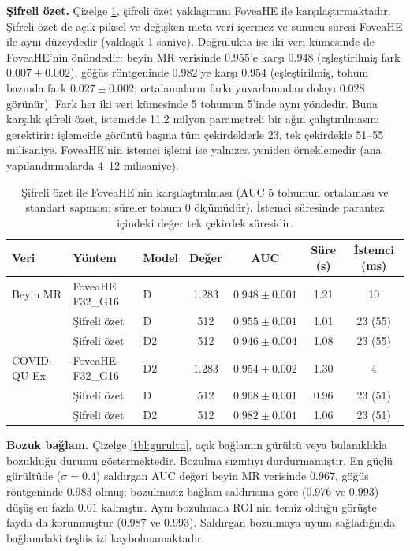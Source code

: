 \textbf{Şifreli özet.} Çizelge \ref{tbl:rakipler}, şifreli özet yaklaşımını FoveaHE ile karşılaştırmaktadır. Şifreli özet de açık piksel ve değişken meta veri içermez ve sunucu süresi FoveaHE ile aynı düzeydedir (yaklaşık 1 saniye). Doğrulukta ise iki veri kümesinde de FoveaHE'nin önündedir: beyin MR verisinde $0.955$'e karşı $0.948$ (eşleştirilmiş fark $0.007 \pm 0.002$), göğüs röntgeninde $0.982$'ye karşı $0.954$ (eşleştirilmiş, tohum bazında fark $0.027 \pm 0.002$; ortalamaların farkı yuvarlamadan dolayı $0.028$ görünür). Fark her iki veri kümesinde 5 tohumun 5'inde aynı yöndedir. Buna karşılık şifreli özet, istemcide 11.2 milyon parametreli bir ağın çalıştırılmasını gerektirir: işlemcide görüntü başına tüm çekirdeklerle 23, tek çekirdekle 51--55 milisaniye. FoveaHE'nin istemci işlemi ise yalnızca yeniden örneklemedir (ana yapılandırmalarda 4--12 milisaniye).

\begin{table}[h!]
{\setlength{\tabcolsep}{4pt}
\caption{Şifreli özet ile FoveaHE'nin karşılaştırılması (AUC 5 tohumun ortalaması ve standart sapması; süreler tohum 0 ölçümüdür). İstemci süresinde parantez içindeki değer tek çekirdek süresidir.}
\begin{center}
\vspace{-6mm}
{\footnotesize
\begin{tabular}{lllcccc}
\hline\hline
Veri & Yöntem & Model & Değer & AUC & Süre (s) & İstemci (ms) \\
\hline
Beyin MR & FoveaHE F32\_G16 & D & 1.283 & $0.948 \pm 0.001$ & 1.21 & 10 \\
 & Şifreli özet & D & 512 & $0.955 \pm 0.001$ & 1.01 & 23 (55) \\
 & Şifreli özet & D2 & 512 & $0.946 \pm 0.004$ & 1.08 & 23 (55) \\
\hline
COVID-QU-Ex & FoveaHE F32\_G16 & D2 & 1.283 & $0.954 \pm 0.002$ & 1.30 & 4 \\
 & Şifreli özet & D & 512 & $0.968 \pm 0.001$ & 0.96 & 23 (51) \\
 & Şifreli özet & D2 & 512 & $0.982 \pm 0.001$ & 1.06 & 23 (51) \\
\hline
\end{tabular}}
\vspace{-6mm}
\end{center}
\label{tbl:rakipler}}
\end{table}

\textbf{Bozuk bağlam.} Çizelge \ref{tbl:gurultu}, açık bağlamın gürültü veya bulanıklıkla bozulduğu durumu göstermektedir. Bozulma sızıntıyı durdurmamıştır. En güçlü gürültüde ($\sigma = 0.4$) saldırgan AUC değeri beyin MR verisinde $0.967$, göğüs röntgeninde $0.983$ olmuş; bozulmasız bağlam saldırısına göre ($0.976$ ve $0.993$) düşüş en fazla $0.01$ kalmıştır. Aynı bozulmada ROI'nin temiz olduğu görüşte fayda da korunmuştur ($0.987$ ve $0.993$). Saldırgan bozulmaya uyum sağladığında bağlamdaki teşhis izi kaybolmamaktadır.

